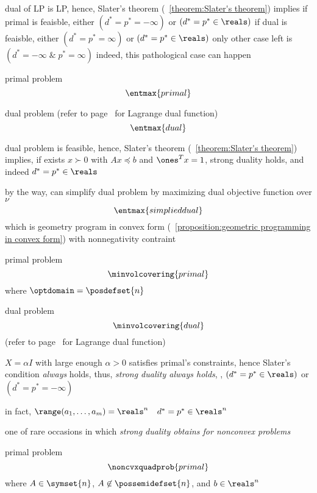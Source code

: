 \documentclass[17pt,landscape]{foils}
\begin{document}
{\vvitem
	dual of LP is LP,
	hence, Slater's theorem (\theoremname~\ref{theorem:Slater's theorem})
	implies
	\bit
	\vitem
		if primal is feaisble,
		either $(d^\ast=p^\ast= -\infty)$ or $(d^\ast=p^\ast\in\reals)$
	\vitem
		if dual is feaisble,
		either $(d^\ast=p^\ast= \infty)$ or $(d^\ast=p^\ast\in\reals)$
	\vitem
		only other case left is $(d^\ast=-\infty\;\&\;p^\ast= \infty)$
		\bit
		\viitem
			indeed, this pathological case can happen
		\eit
	\eit
\eit



\bit
\item
	primal problem
	$$
		\entmax{primal}
	$$

\vitem
	dual problem
	(refer to page~\pageref{page:dual function of entropy maximization} for Lagrange dual function)
	$$
		\entmax{dual}
	$$

\vitem
	dual problem is feasible,
	hence, Slater's theorem (\theoremname~\ref{theorem:Slater's theorem})
	implies,
		if exists $x\succ 0$ with $Ax \preceq b$ and $\ones^T x =1$,
		strong duality holds,
		and indeed $d^\ast=p^\ast\in\reals$

\vitem
	by the way,
	can simplify dual problem by maximizing dual objective function over $\nu$
	$$
		\entmax{simplied dual}
	$$
	which is geometry program in convex form
	(\propositionname~\ref{proposition:geometric programming in convex form})
	with nonnegativity contraint
\eit
\vfill



\bit
\item
	primal problem
	$$
		\minvolcovering{primal}
	$$
	where $\optdomain=\posdefset{n}$

\vitem
	dual problem
	$$
		\minvolcovering{dual}
	$$
	(refer to page~\pageref{page:dual function of minimum volume covering ellipsoid} for Lagrange dual function)

\vitem
	$X=\alpha I$ with large enough $\alpha>0$ satisfies primal's constraints,
	hence Slater's condition \emph{always} holds,
	thus,
	\emph{strong duality always holds},
	\ie, $(d^\ast = p^\ast \in \reals)$ or $(d^\ast = p^\ast = -\infty)$

\vitem in fact, $\range(a_1,\ldots,a_m) = \reals^n$ \iaoi\ $d^\ast=p^\ast\in\reals^n$
\eit



\bit
\item one of rare occasions
	in which
	\emph{strong duality obtains for nonconvex problems}
\item
	primal problem
	$$
		\noncvxquadprob{primal}
	$$
	where $A\in\symset{n}$, $A\not\in\possemidefset{n}$, and $b\in\reals^n$

}
\end{document}
